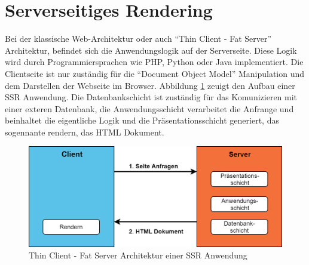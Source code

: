 \documentclass[runningheads]{llncs}
\begin{document}
\section{Serverseitiges Rendering}
\label{sec:Serverseitiges Rendering}
Bei der klassische Web-Architektur oder auch “Thin Client - Fat Server” 
Architektur, befindet sich die Anwendungslogik auf der Serverseite. 
Diese Logik wird durch Programmiersprachen wie PHP, Python oder Java 
implementiert. Die Clientseite ist nur zuständig für die “Document Object Model” 
Manipulation und dem Darstellen der Webseite im Browser. Abbildung \ref{Thin Client - Fat Server Architektur einer SSR Anwendung} 
zeuigt den Aufbau einer SSR Anwendung. Die Datenbankschicht ist zuständig für das Komunizieren mit einer exteren
Datenbank, die Anwendungsschicht verarbeitet die Anfrange und beinhaltet die eigentliche Logik und die Präsentationsschicht generiert,
das sogennante rendern, das HTML Dokument.

\begin{figure}[h]
  \centering
  \includegraphics[width=12cm]{images/server}
  \caption{Thin Client - Fat Server Architektur einer SSR Anwendung}
  \label{Thin Client - Fat Server Architektur einer SSR Anwendung}
\end{figure}
\end{document}
